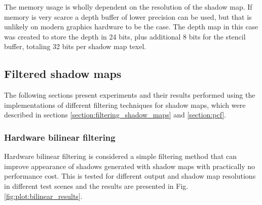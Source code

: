 The memory usage is wholly dependent on the resolution of the shadow map. If memory is very scarce a depth buffer of lower precision can be used, but that is unlikely on modern graphics hardware to be the case. The depth map in this case was created to store the depth in 24 bits, plus additional 8 bits for the stencil buffer, totaling 32 bits per shadow map texel.

\subsection{Filtered shadow maps}
The following sections present experiments and their results performed using the implementations of different filtering techniques for shadow maps, which were described in sections \ref{section:filtering_shadow_maps} and \ref{section:pcf}.

\subsubsection{Hardware bilinear filtering}
\label{section:test_bilinear}
Hardware bilinear filtering is considered a simple filtering method that can improve appearance of shadows generated with shadow maps with practically no performance cost. This is tested for different output and shadow map resolutions in different test scenes and the results are presented in Fig. \ref{fig:plot:bilinear_results}.


